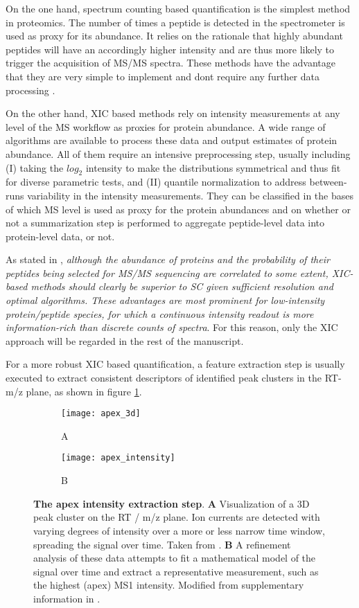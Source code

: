 On the one hand, spectrum counting based quantification is the simplest method in proteomics. The number of times a peptide is detected in the spectrometer is used as proxy for its abundance. It relies on the rationale that highly abundant peptides will have an accordingly higher intensity and are thus more likely to trigger the acquisition of MS/MS spectra. These methods have the advantage that they are very simple to implement and don\textquotesingle t require any further data processing \cite{Barsnes2008}.

On the other hand, \ac{XIC} based methods rely on intensity measurements at any level of the \ac{MS} workflow as proxies for protein abundance. A wide range of algorithms are available to process these data and output estimates of protein abundance. All of them require an intensive preprocessing step, usually including (I) taking the $log_2$ intensity to make the distributions symmetrical and thus fit for diverse parametric tests, and (II) quantile normalization to address between-runs variability in the intensity measurements. They can be classified in the bases of which MS level is used as proxy for the protein abundances and on whether or not a summarization step is performed to aggregate peptide-level data into protein-level data, or not. 


As stated in \cite{Cox2014}, \textit{although the abundance of proteins and the probability of their peptides being selected for \ac{MS/MS} sequencing are correlated to some extent, \ac{XIC}-based methods should clearly be superior to \ac{SC} given sufficient resolution and optimal algorithms. These advantages are most prominent for low-intensity protein/peptide species, for which a continuous intensity readout is more information-rich than discrete counts of spectra}. For this reason, only the \ac{XIC} approach will be regarded in the rest of the manuscript.  

For a more robust XIC based quantification, a feature extraction step is usually executed to extract consistent descriptors of identified peak clusters in the RT-m/z plane, as shown in figure \ref{figure:moff_apex}.

\begin{figure}[!h]
\centering
\begin{subfigure}{1\textwidth}
\centering
\caption*{A}
\texttt{[image: apex\_3d]}
\end{subfigure}
\bigskip
\begin{subfigure}{1\textwidth}
\centering
\caption*{B}
\texttt{[image: apex\_intensity]}
\end{subfigure}
\caption[Apex MS1 intensity module]{\textbf{The apex intensity extraction step}. \textbf{A} Visualization of a 3D peak cluster on the RT / m/z plane. Ion currents are detected with varying degrees of intensity over a more or less narrow time window, spreading the signal over time. Taken from \cite{Smith2014}. \textbf{B} A refinement analysis of these data attempts to fit a mathematical model of the signal over time and extract a representative measurement, such as the highest (apex) \ac{MS1} intensity. Modified from supplementary information in \cite{Argentini2016}.}
\label{figure:moff_apex}
\end{figure}


